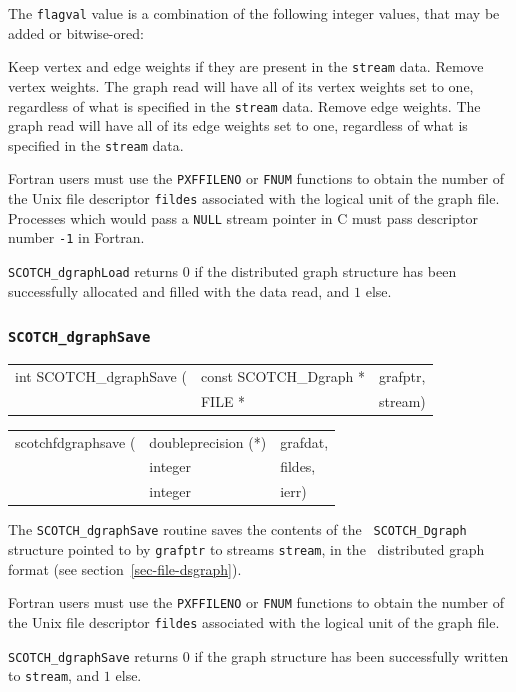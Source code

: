 \begin{itemize}
The {\tt flagval} value is a combination of the following integer values,
that may be added or bitwise-ored:
\begin{itemize}
\iteme[{\tt 0}]
Keep vertex and edge weights if they are present in the {\tt stream} data.
\iteme[{\tt 1}]
Remove vertex weights. The graph read will have all of its vertex weights
set to one, regardless of what is specified in the {\tt stream} data.
\iteme[{\tt 2}]
Remove edge weights. The graph read will have all of its edge weights
set to one, regardless of what is specified in the {\tt stream} data.
\end{itemize}

Fortran users must use the {\tt PXFFILENO} or {\tt FNUM} functions to
obtain the number of the Unix file descriptor {\tt fildes} associated
with the logical unit of the graph file. Processes which would pass a
{\tt NULL} stream pointer in C must pass descriptor number {\tt -1} in
Fortran.

\progret

{\tt SCOTCH\_dgraphLoad} returns $0$ if the distributed graph
structure has been successfully allocated and filled with the data
read, and $1$ else.
\end{itemize}

\subsubsection{{\tt SCOTCH\_dgraphSave}}

\begin{itemize}
\progsyn

{\tt\begin{tabular}{l@{}ll}
int SCOTCH\_dgraphSave ( & const SCOTCH\_Dgraph * & grafptr, \\
                         & FILE *                 & stream)
\end{tabular}}

{\tt\begin{tabular}{l@{}ll}
scotchfdgraphsave ( & doubleprecision (*) & grafdat, \\
                    & integer             & fildes, \\
                    & integer             & ierr)
\end{tabular}}

\progdes

The {\tt SCOTCH\_dgraphSave} routine saves the contents of the {\tt
SCOTCH\_\lbt Dgraph} structure pointed to by {\tt grafptr} to streams
{\tt stream}, in the \scotch\ distributed graph format (see
section~\ref{sec-file-dsgraph}).

Fortran users must use the {\tt PXFFILENO} or {\tt FNUM} functions to
obtain the number of the Unix file descriptor {\tt fildes} associated
with the logical unit of the graph file.

\progret

{\tt SCOTCH\_dgraphSave} returns $0$ if the graph structure has been
successfully written to {\tt stream}, and $1$ else.
\end{itemize}

